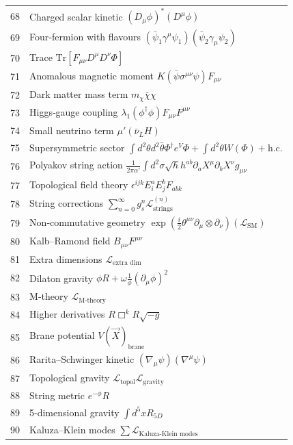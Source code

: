 \documentclass[12pt,a4paper]{article}
\begin{document}
\begin{longtable}{r l}
		68 & Charged scalar kinetic \((D_\mu\phi)^*(D^\mu\phi)\) \\
		69 & Four‑fermion with flavours \((\bar{\psi}_1\gamma^\mu\psi_1)(\bar{\psi}_2\gamma_\mu\psi_2)\) \\
		70 & Trace \(\mathrm{Tr}[F_{\mu\nu}D^\mu D^\nu\Phi]\) \\
		71 & Anomalous magnetic moment \(K(\bar{\psi}\sigma^{\mu\nu}\psi)F_{\mu\nu}\) \\
		72 & Dark matter mass term \(m_\chi\bar{\chi}\chi\) \\
		73 & Higgs‑gauge coupling \(\lambda_1(\phi^\dagger\phi)F_{\mu\nu}F^{\mu\nu}\) \\
		74 & Small neutrino term \(\mu'(\bar{\nu}_L H)\) \\
		75 & Supersymmetric sector \(\int d^2\theta d^2\bar{\theta}\Phi^\dagger e^V\Phi + \int d^2\theta W(\Phi) + \text{h.c.}\) \\
		76 & Polyakov string action \(\frac{1}{2\pi\alpha'}\int d^2\sigma\sqrt{h}h^{ab}\partial_a X^\mu\partial_b X^\nu g_{\mu\nu}\) \\
		77 & Topological field theory \(\epsilon^{ijk}E_i^a E_j^b F_{ab k}\) \\
		78 & String corrections \(\sum_{n=0}^\infty g_s^n \mathcal{L}^{(n)}_{\text{strings}}\) \\
		79 & Non‑commutative geometry \(\exp\left(\frac{i}{2}\theta^{\mu\nu}\partial_\mu\otimes\partial_\nu\right)(\mathcal{L}_{\text{SM}})\) \\
		80 & Kalb–Ramond field \(B_{\mu\nu}F^{\mu\nu}\) \\
		81 & Extra dimensions \(\mathcal{L}_{\text{extra dim}}\) \\
		82 & Dilaton gravity \(\phi R + \omega\frac{1}{\phi}(\partial_\mu\phi)^2\) \\
		83 & M‑theory \(\mathcal{L}_{\text{M‑theory}}\) \\
		84 & Higher derivatives \(R\Box^k R\sqrt{-g}\) \\
		85 & Brane potential \(V(\vec{X})_{\text{brane}}\) \\
		86 & Rarita–Schwinger kinetic \((\nabla_\mu\psi)(\nabla^\mu\psi)\) \\
		87 & Topological gravity \(\mathcal{L}_{\text{topol}}\mathcal{L}_{\text{gravity}}\) \\
		88 & String metric \(e^{-\phi}R\) \\
		89 & 5‑dimensional gravity \(\int d^5x R_{5D}\) \\
		90 & Kaluza–Klein modes \(\sum\mathcal{L}_{\text{Kaluza‑Klein modes}}\) \\

\end{longtable}
\end{document}
